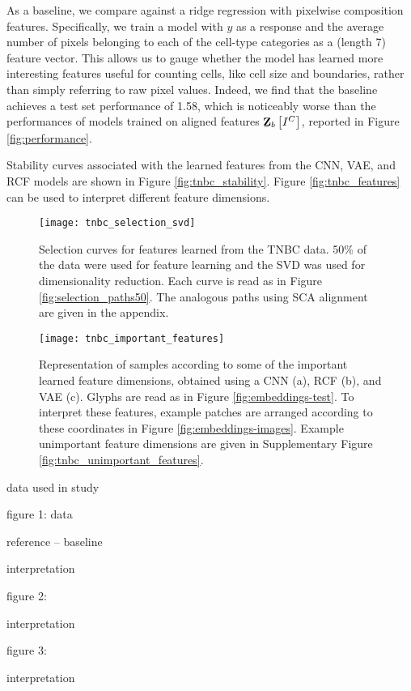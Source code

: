 As a baseline, we compare against a ridge regression with pixelwise composition
features. Specifically, we train a model with $y$ as a response and the average
number of pixels belonging to each of the cell-type categories as a (length 7)
feature vector. This allows us to gauge whether the model has learned more
interesting features useful for counting cells, like cell size and boundaries,
rather than simply referring to raw pixel values. Indeed, we find that the
baseline achieves a test set performance of 1.58, which is noticeably worse than
the performances of models trained on aligned features
$\underaccent{\bar}{\mathbf{Z}}_{b}\left[I^{C}\right]$, reported in Figure
\ref{fig:performance}.

Stability curves associated with the learned features from the CNN, VAE, and RCF
models are shown in Figure \ref{fig:tnbc_stability}. Figure
\ref{fig:tnbc_features} can be used to interpret different feature dimensions.

\begin{figure}
  \centering
  \texttt{[image: tnbc\_selection\_svd]}
  \caption{Selection curves for features learned from the TNBC data. 50\% of
    the data were used for feature learning and the SVD was used for
    dimensionality reduction. Each curve is read as in Figure
    \ref{fig:selection_paths50}. The analogous paths using SCA alignment are
    given in the appendix. }
  \label{fig:tnbc_selection_svd}
\end{figure}

\begin{figure}
  \centering
  \texttt{[image: tnbc\_important\_features]}
  \caption{Representation of samples according to some of the important learned
    feature dimensions, obtained using a CNN (a), RCF (b), and VAE (c). Glyphs
    are read as in Figure \ref{fig:embeddings-test}. To interpret these
    features, example patches are arranged according to these coordinates in
    Figure \ref{fig:embeddings-images}. Example unimportant feature dimensions
    are given in Supplementary Figure \ref{fig:tnbc_unimportant_features}.}
  \label{fig:tnbc_important_features}
\end{figure}

data used in study

figure 1: data

reference -- baseline

interpretation

figure 2:

interpretation

figure 3:

interpretation
